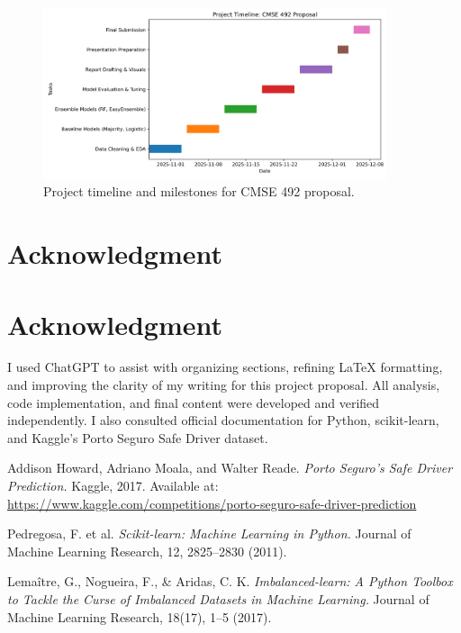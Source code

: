 \documentclass[11pt]{article}
\begin{document}
\begin{figure}[h]
    \centering
    \includegraphics[width=0.9\textwidth]{../figures/gantt_chart.png}
    \caption{Project timeline and milestones for CMSE 492 proposal.}
\end{figure}

\section*{Acknowledgment}\section*{Acknowledgment}
I used ChatGPT to assist with organizing sections, refining LaTeX formatting, and improving the clarity of my writing for this project proposal. 
All analysis, code implementation, and final content were developed and verified independently. 
I also consulted official documentation for Python, scikit-learn, and Kaggle’s Porto Seguro Safe Driver dataset.

\begin{thebibliography}{9}

Addison Howard, Adriano Moala, and Walter Reade.
\textit{Porto Seguro’s Safe Driver Prediction.}
Kaggle, 2017. Available at: \url{https://www.kaggle.com/competitions/porto-seguro-safe-driver-prediction}

Pedregosa, F. et al.
\textit{Scikit-learn: Machine Learning in Python.}
Journal of Machine Learning Research, 12, 2825–2830 (2011).

Lemaître, G., Nogueira, F., & Aridas, C. K.
\textit{Imbalanced-learn: A Python Toolbox to Tackle the Curse of Imbalanced Datasets in Machine Learning.}
Journal of Machine Learning Research, 18(17), 1–5 (2017).

\end{thebibliography}
\end{document}
